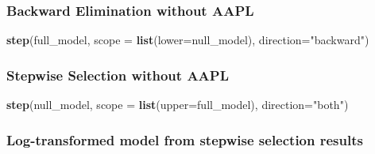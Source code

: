 \documentclass[]{article}
\newenvironment{Shaded}{\begin{snugshade}}{\end{snugshade}}
\newcommand{\KeywordTok}[1]{\textcolor[rgb]{0.13,0.29,0.53}{\textbf{#1}}}
\newcommand{\DataTypeTok}[1]{\textcolor[rgb]{0.13,0.29,0.53}{#1}}
\newcommand{\DecValTok}[1]{\textcolor[rgb]{0.00,0.00,0.81}{#1}}
\newcommand{\StringTok}[1]{\textcolor[rgb]{0.31,0.60,0.02}{#1}}
\newcommand{\OperatorTok}[1]{\textcolor[rgb]{0.81,0.36,0.00}{\textbf{#1}}}
\newcommand{\NormalTok}[1]{#1}
\begin{document}
\subsubsection{Backward Elimination without
AAPL}\label{backward-elimination-without-aapl}

\begin{Shaded}
\begin{Highlighting}[]
\KeywordTok{step}\NormalTok{(full_model, }\DataTypeTok{scope =} \KeywordTok{list}\NormalTok{(}\DataTypeTok{lower=}\NormalTok{null_model), }\DataTypeTok{direction=}\StringTok{"backward"}\NormalTok{)}
\end{Highlighting}
\end{Shaded}

\subsubsection{Stepwise Selection without
AAPL}\label{stepwise-selection-without-aapl}

\begin{Shaded}
\begin{Highlighting}[]
\KeywordTok{step}\NormalTok{(null_model, }\DataTypeTok{scope =} \KeywordTok{list}\NormalTok{(}\DataTypeTok{upper=}\NormalTok{full_model), }\DataTypeTok{direction=}\StringTok{"both"}\NormalTok{)}
\end{Highlighting}
\end{Shaded}

\subsubsection{Log-transformed model from stepwise selection
results}\label{log-transformed-model-from-stepwise-selection-results}

\begin{Shaded}
\end{Shaded}
\end{document}
